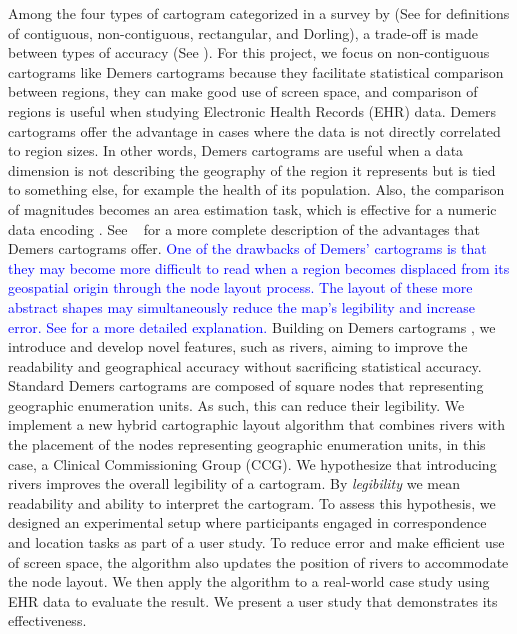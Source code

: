 \documentclass[Afour,sagev,times]{sagej}
\newcommand{\new}[1]{\textcolor{blue}{#1}}
\newcommand{\citea}[1]{\citeauthor{#1}~\cite{#1}}
\begin{document}
Among the four types of cartogram categorized in a survey by \citet{nusrat2016State} (See  for definitions of contiguous, non-contiguous, rectangular, and Dorling), a trade-off is made between types of accuracy (See ).
For this project, we focus on non-contiguous cartograms like Demers cartograms because they facilitate statistical comparison between regions, they can make good use of screen space, and comparison of regions is useful when studying Electronic Health Records (EHR) data.
Demers cartograms offer the advantage in cases where the data is not directly correlated to region sizes.
In other words, Demers cartograms are useful when a data dimension is not describing the geography of the region it represents but is tied to something else, for example the health of its population.
Also, the comparison of magnitudes becomes an area estimation task, which is effective for a numeric data encoding \cite{munzner2014Visualization}.
See \citea{nickel2022Multicriteria} for a more complete description of the advantages that Demers cartograms offer.
\new{One of the drawbacks of Demers' cartograms is that they may become more difficult to read when a region becomes displaced from its geospatial origin through the node layout process.
The layout of these more abstract shapes may simultaneously reduce the map's legibility and increase error.
See \citet{tong2018Cartograms} for a more detailed explanation.}
Building on Demers cartograms \cite{ian2002Cartogram}, we introduce and develop novel features, such as rivers, aiming to improve the readability and geographical accuracy without sacrificing statistical accuracy.
Standard Demers cartograms are composed of square nodes that representing geographic enumeration units.
As such, this can reduce their legibility.
We implement a new hybrid cartographic layout algorithm that combines rivers with the placement of the nodes representing geographic enumeration units, in this case, a Clinical Commissioning Group (CCG).
We hypothesize that introducing rivers improves the overall legibility of a cartogram.
By \textit{legibility} we mean readability and ability to interpret the cartogram.
To assess this hypothesis, we designed an experimental setup where participants engaged in correspondence and location tasks as part of a user study.
To reduce error and make efficient use of screen space, the algorithm also updates the position of rivers to accommodate the node layout.
We then apply the algorithm to a real-world case study using EHR data to evaluate the result.
We present a user study that demonstrates its effectiveness.
\end{document}
